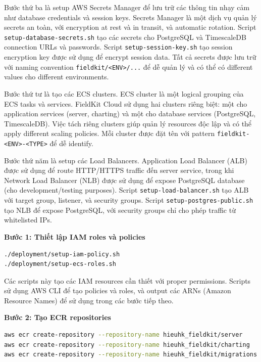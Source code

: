 Bước thứ ba là setup AWS Secrets Manager để lưu trữ các thông tin nhạy cảm như database credentials và session keys. Secrets Manager là một dịch vụ quản lý secrets an toàn, với encryption at rest và in transit, và automatic rotation. Script \texttt{setup-database-secrets.sh} tạo các secrets cho PostgreSQL và TimescaleDB connection URLs và passwords. Script \texttt{setup-session-key.sh} tạo session encryption key được sử dụng để encrypt session data. Tất cả secrets được lưu trữ với naming convention \texttt{fieldkit/<ENV>/...} để dễ quản lý và có thể có different values cho different environments.

Bước thứ tư là tạo các ECS clusters. ECS cluster là một logical grouping của ECS tasks và services. FieldKit Cloud sử dụng hai clusters riêng biệt: một cho application services (server, charting) và một cho database services (PostgreSQL, TimescaleDB). Việc tách riêng clusters giúp quản lý resources độc lập và có thể apply different scaling policies. Mỗi cluster được đặt tên với pattern \texttt{fieldkit-<ENV>-<TYPE>} để dễ identify.

Bước thứ năm là setup các Load Balancers. Application Load Balancer (ALB) được sử dụng để route HTTP/HTTPS traffic đến server service, trong khi Network Load Balancer (NLB) được sử dụng để expose PostgreSQL database (cho development/testing purposes). Script \texttt{setup-load-balancer.sh} tạo ALB với target group, listener, và security groups. Script \texttt{setup-postgres-public.sh} tạo NLB để expose PostgreSQL, với security groups chỉ cho phép traffic từ whitelisted IPs.

\textbf{Bước 1: Thiết lập IAM roles và policies}
\begin{lstlisting}[language=bash, caption=Thiết lập IAM]
./deployment/setup-iam-policy.sh
./deployment/setup-ecs-roles.sh
\end{lstlisting}

Các scripts này tạo các IAM resources cần thiết với proper permissions. Scripts sử dụng AWS CLI để tạo policies và roles, và output các ARNs (Amazon Resource Names) để sử dụng trong các bước tiếp theo.

\textbf{Bước 2: Tạo ECR repositories}
\begin{lstlisting}[language=bash, caption=Tạo ECR repositories]
aws ecr create-repository --repository-name hieuhk_fieldkit/server
aws ecr create-repository --repository-name hieuhk_fieldkit/charting
aws ecr create-repository --repository-name hieuhk_fieldkit/migrations
\end{lstlisting}

